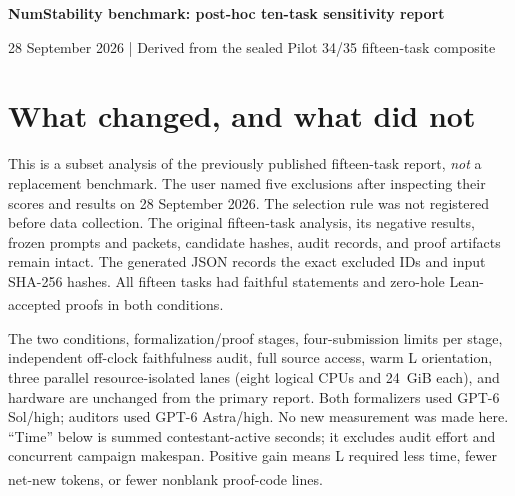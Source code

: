 \documentclass[10pt,a4paper]{article}
\newcommand{\src}[1]{\textsuperscript{\cite{#1}}}
\begin{document}
\begin{center}
{\Large\bfseries NumStability benchmark: post-hoc ten-task sensitivity report}\par
\vspace{2mm}
{\small 28 September 2026 \quad | \quad Derived from the sealed Pilot 34/35 fifteen-task composite}
\end{center}

\begin{abstract}
After viewing the fifteen-task outcomes, five tasks were selected for removal:
HI21-EQ2.7, P14-SHIFTED-SUM, P14-ALT-SOFTMAX, P14-SHIFTED-LOG, and
P14-SHIFTED-WEIGHTED. No contestant was rerun and no source result was altered.
In the remaining ten, L (Mathlib plus NumStability) used 19.7\% fewer proof-code
lines and 22.5\% less contestant-active time than N (Mathlib only), excluding
the one-time warm scout. Charging that scout once leaves a 19.9\% time gain.
Across realized-reuse scores 1, 2, and 3, the selected cohort's aggregate
time gains are $-9.1\%$, $+19.3\%$, and $+31.1\%$. This is a stronger
\emph{descriptive} pattern than in the complete corpus. It is not an unbiased
or prospective test: both task exclusions and the five prior favorable retained
tasks depend on observed outcomes; the reuse rubric was also annotated after
the outcomes. Among only the five newly screened tasks still included, L is
7.2\% faster but uses 6.4\% more proof lines.\src{primary,metrics,reuse,derived}
\end{abstract}

\section{What changed, and what did not}

This is a subset analysis of the previously published fifteen-task report,
\emph{not} a replacement benchmark. The user named five exclusions after
inspecting their scores and results on 28 September 2026. The selection rule
was not registered before data collection. The original fifteen-task analysis,
its negative results, frozen prompts and packets, candidate hashes, audit
records, and proof artifacts remain intact. The generated JSON records the
exact excluded IDs and input SHA-256 hashes. All fifteen tasks had faithful
statements and zero-hole Lean-accepted proofs in both conditions.\src{primary,metrics,derived}

The two conditions, formalization/proof stages, four-submission limits per
stage, independent off-clock faithfulness audit, full source access, warm L
orientation, three parallel resource-isolated lanes (eight logical CPUs and
24~GiB each), and hardware are unchanged from the primary report. Both
formalizers used GPT-6 Sol/high; auditors used GPT-6 Astra/high. No new measurement was made
here. ``Time'' below is summed contestant-active seconds; it excludes audit
effort and concurrent campaign makespan. Positive gain means L required less
time, fewer net-new tokens, or fewer nonblank proof-code lines.\src{primary,metrics}
\end{document}
